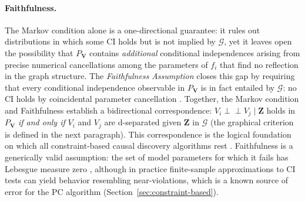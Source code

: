 \paragraph{Faithfulness.}
The Markov condition alone is a one-directional guarantee: it rules out distributions in which some CI holds but is not implied by $\mathcal{G}$, yet it leaves open the possibility that $P_{\mathbf{V}}$ contains \emph{additional} conditional independences arising from precise numerical cancellations among the parameters of $f_i$ that find no reflection in the graph structure.
The \emph{Faithfulness Assumption} closes this gap by requiring that every conditional independence observable in $P_{\mathbf{V}}$ is in fact entailed by $\mathcal{G}$: no CI holds by coincidental parameter cancellation \cite{Spirtes2001CausationPA}.
Together, the Markov condition and Faithfulness establish a bidirectional correspondence: $V_i \perp\!\!\!\perp V_j \mid \mathbf{Z}$ holds in $P_{\mathbf{V}}$ \emph{if and only if} $V_i$ and $V_j$ are d-separated given $\mathbf{Z}$ in $\mathcal{G}$ (the graphical criterion is defined in the next paragraph).
This correspondence is the logical foundation on which all constraint-based causal discovery algorithms rest \cite{Spirtes2001CausationPA, Peters2017ElementsOC}.
Faithfulness is a generically valid assumption: the set of model parameters for which it fails has Lebesgue measure zero \cite{Meek1995CausalIA}, although in practice finite-sample approximations to CI tests can yield behavior resembling near-violations, which is a known source of error for the PC algorithm (Section~\ref{sec:constraint-based}).


